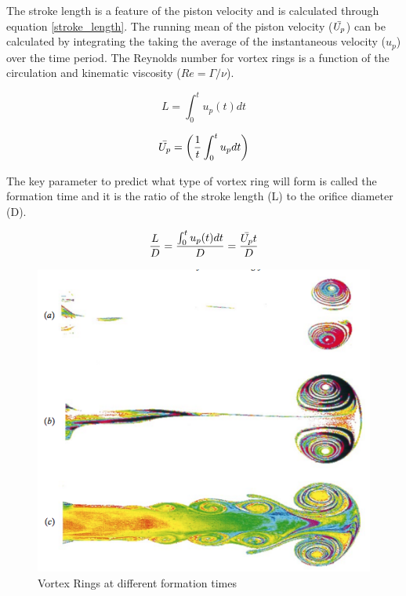 \documentclass[a4paper,12pt]{article}
\begin{document}
The stroke length is a feature of the piston velocity and is calculated through equation \ref{stroke_length}. The running mean of the piston velocity ($\Bar{U_p}$) can be calculated by integrating the taking the average of the instantaneous velocity ($u_p$) over the time period. The Reynolds number for vortex rings is a function of the circulation and kinematic viscosity ($Re = \Gamma / \nu$).

\begin{equation}
    L = \int^t_0 u_p(t)dt
    \label{stroke_length}
\end{equation}

\begin{equation}
    \Bar{U_p} = \left(\frac{1}{t} \int^t_0 u_p dt \right)
    \label{mean_velocity}
\end{equation}

The key parameter to predict what type of vortex ring will form is called the formation time and it is the ratio of the stroke length (L) to the orifice diameter (D).

\begin{equation}
    \frac{L}{D} = \frac{\int^t_0 u_p(t)dt}{D} = \frac{\Bar{U_p} t}{D}
\end{equation}

\begin{figure}[ht]
\centering
\includegraphics[width=0.8\linewidth]{formation_time.png}
\caption{Vortex Rings at different formation times \cite{universal_timescale}}
\label{fig:formation_time}
\end{figure}
\end{document}
